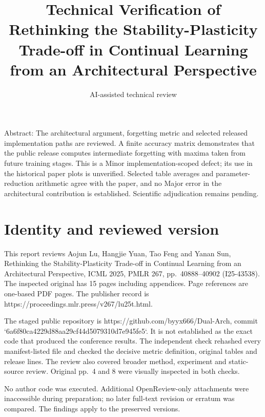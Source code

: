 \documentclass[10pt]{article}
\title{Technical Verification of Rethinking the Stability-Plasticity Trade-off in Continual Learning from an Architectural Perspective}
\author{AI-assisted technical review}
\date{}
\begin{document}
\maketitle
Abstract: The architectural argument, forgetting metric and selected released implementation paths are reviewed. A finite accuracy matrix demonstrates that the public release computes intermediate forgetting with maxima taken from future training stages. This is a Minor implementation-scoped defect; its use in the historical paper plots is unverified. Selected table averages and parameter-reduction arithmetic agree with the paper, and no Major error in the architectural contribution is established. Scientific adjudication remains pending.\par
\section*{Identity and reviewed version}
This report reviews Aojun Lu, Hangjie Yuan, Tao Feng and Yanan Sun, Rethinking the Stability-Plasticity Trade-off in Continual Learning from an Architectural Perspective, ICML 2025, PMLR 267, pp. 40888–40902 (I25-43538). The inspected original has 15 pages including appendices. Page references are one-based PDF pages. The publisher record is https://proceedings.mlr.press/v267/lu25t.html.\par
The staged public repository is https://github.com/byyx666/Dual-Arch, commit `6a6f80ca4229d88aa29cf44d5079310d7e945fe5`. It is not established as the exact code that produced the conference results. The independent check rehashed every manifest-listed file and checked the decisive metric definition, original tables and release lines. The review also covered broader method, experiment and static-source review. Original pp. 4 and 8 were visually inspected in both checks.\par
No author code was executed. Additional OpenReview-only attachments were inaccessible during preparation; no later full-text revision or erratum was compared. The findings apply to the preserved versions.\par
\end{document}
